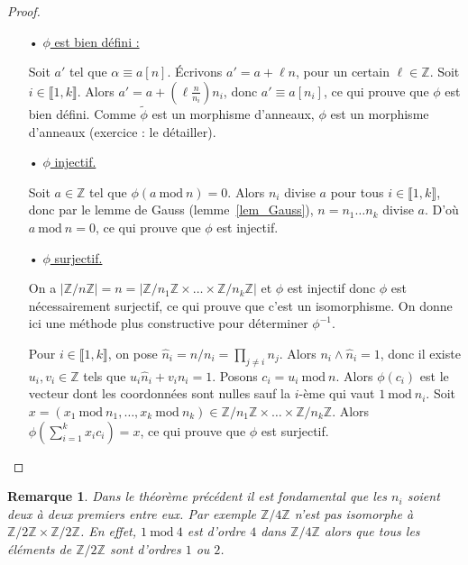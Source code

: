 \documentclass[12pt]{report}
\newtheorem{remarque}[thm]{Remarque}
\newcommand{\Z}{\mathbb{Z}}
\begin{document}
\begin{proof}\
\begin{itemize}
\item[•] \underline{$\phi$ est bien défini :}\par 
Soit $a'$ tel que $\alpha \equiv a [n]$. Écrivons $a'=a+\ell n$, pour un certain $\ell\in  \Z$. Soit $i\in \llbracket 1,k\rrbracket$. Alors $a'=a+(\ell\frac{n}{n_i})n_i$, donc $a'\equiv a [n_i]$, ce qui prouve que $\phi$ est bien défini. Comme $\tilde{\phi}$ est un morphisme d'anneaux, $\phi$ est un morphisme d'anneaux (exercice : le détailler).




\item[•] \underline{$\phi$ injectif.} \par 
Soit $a\in \Z$ tel que $\phi(a\mathrm{\ mod\ } n)=0$. Alors $n_i$ divise $a$ pour tous $i\in \llbracket 1,k\rrbracket$, donc par le lemme de Gauss (lemme~\ref{lem_Gauss}), $n=n_1\ldots n_k$ divise $a$. D'où $a\mathrm{\ mod\ }n=0$, ce qui prouve que $\phi$ est injectif.





\item[•] \underline{$\phi$ surjectif.} \par 

On a $|\Z/n\Z|=n=|\Z/n_1\Z\times \ldots \times \Z/n_k\Z|$ et $\phi$ est injectif donc $\phi$ est nécessairement surjectif, ce qui prouve que c'est un isomorphisme. On donne ici une méthode plus constructive pour déterminer $\phi^{-1}$.

Pour $i\in \llbracket 1,k\rrbracket$, on pose $\hat{n}_i=n/n_i=\prod_{j\neq i} n_j$. Alors $n_i\wedge \hat{n}_i=1$, donc il existe $u_i,v_i\in \Z$ tels que $u_i\hat{n}_i+v_in_i=1$. Posons $c_i=u_i\mathrm{\ mod \ }n$. Alors $\phi(c_i)$ est le vecteur dont les coordonnées sont nulles sauf la $i$-ème qui vaut $1\mathrm{\ mod\ }n_i$.  Soit $x=(x_1 \mathrm{\ mod\ }n_1,\ldots,x_k \mathrm{\ mod\ }n_k)\in \Z/n_1\Z\times \ldots\times \Z/n_k \Z$. Alors $\phi(\sum_{i=1}^k x_i c_i)=x$, ce qui prouve que $\phi$ est surjectif. 
 \end{itemize}
\end{proof}

\begin{remarque}
Dans le théorème précédent il est fondamental que les $n_i$ soient deux à deux premiers entre eux. Par exemple $\Z/4\Z$ n'est pas isomorphe à $\Z/2\Z\times \Z/2\Z$. En effet, $1\mathrm{\ mod\ }4$ est d'ordre $4$ dans $\Z/4\Z$ alors que tous les éléments de $\Z/2\Z$ sont d'ordres $1$ ou $2$. 
\end{remarque}
\end{document}
